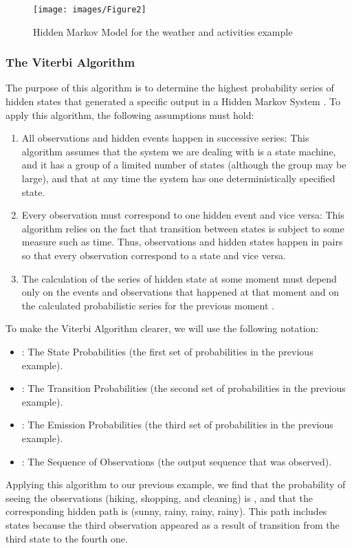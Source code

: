 \documentclass{acm_proc_article-sp}
\begin{document}
\begin{figure}
  \centering
  \texttt{[image: images/Figure2]}
  \caption{Hidden Markov Model for the weather and activities example}\label{Hidden-Markov-Model-for}
\end{figure}

\subsubsection{The Viterbi Algorithm}\label{The-Viterbi-Algorithm}
The purpose of this algorithm is to determine the highest probability series of hidden states that generated a specific output in a Hidden Markov System \cite{Viterbi1967}. To apply this algorithm, the following assumptions must hold:
\begin{enumerate}
    \item All observations and hidden events happen in successive series: This algorithm assumes that the system we are dealing with is a state machine, and it has a group of a limited number of states (although the group may be large), and that at any time the system has one deterministically specified state.
    \item Every observation must correspond to one hidden event and vice versa: This algorithm relies on the fact that transition between states is subject to some measure such as time. Thus, observations and hidden states happen in pairs so that every observation correspond to a state and vice versa.
    \item The calculation of the series of hidden state at some moment  must depend only on the events and observations that happened at that moment  and on the calculated probabilistic series for the previous moment .
\end{enumerate}
To make the Viterbi Algorithm clearer, we will use the following notation:
\begin{itemize}
    \item : The State Probabilities (the first set of probabilities in the previous example).
    \item : The Transition Probabilities (the second set of probabilities in the previous example).
    \item : The Emission Probabilities (the third set of probabilities in the previous example).
    \item : The Sequence of Observations (the output sequence that was observed).
\end{itemize}
Applying this algorithm to our previous example, we find that the probability of seeing the observations (hiking, shopping, and cleaning) is , and that the corresponding hidden path is (sunny, rainy, rainy, rainy). This path includes  states because the third observation appeared as a result of transition from the third state to the fourth one.
\end{document}
